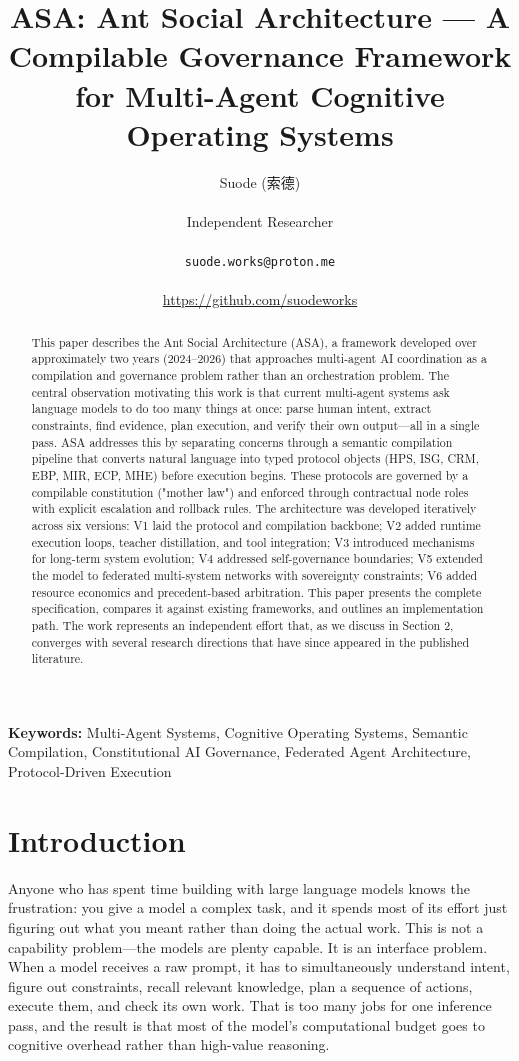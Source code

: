 \documentclass[12pt,a4paper]{article}
\title{ASA: Ant Social Architecture --- A Compilable Governance Framework for Multi-Agent Cognitive Operating Systems}
\author{Suode (索德) \\\\ Independent Researcher \\\\ \texttt{suode.works@proton.me} \\\\ \url{https://github.com/suodeworks}}
\date{}
\begin{document}
\maketitle

\begin{abstract}
This paper describes the Ant Social Architecture (ASA), a framework developed over approximately two years (2024--2026) that approaches multi-agent AI coordination as a compilation and governance problem rather than an orchestration problem. The central observation motivating this work is that current multi-agent systems ask language models to do too many things at once: parse human intent, extract constraints, find evidence, plan execution, and verify their own output---all in a single pass. ASA addresses this by separating concerns through a semantic compilation pipeline that converts natural language into typed protocol objects (HPS, ISG, CRM, EBP, MIR, ECP, MHE) before execution begins. These protocols are governed by a compilable constitution ("mother law") and enforced through contractual node roles with explicit escalation and rollback rules. The architecture was developed iteratively across six versions: V1 laid the protocol and compilation backbone; V2 added runtime execution loops, teacher distillation, and tool integration; V3 introduced mechanisms for long-term system evolution; V4 addressed self-governance boundaries; V5 extended the model to federated multi-system networks with sovereignty constraints; V6 added resource economics and precedent-based arbitration. This paper presents the complete specification, compares it against existing frameworks, and outlines an implementation path. The work represents an independent effort that, as we discuss in Section 2, converges with several research directions that have since appeared in the published literature.
\end{abstract}

\noindent\textbf{Keywords:} Multi-Agent Systems, Cognitive Operating Systems, Semantic Compilation, Constitutional AI Governance, Federated Agent Architecture, Protocol-Driven Execution


\section{Introduction}


Anyone who has spent time building with large language models knows the frustration: you give a model a complex task, and it spends most of its effort just figuring out what you meant rather than doing the actual work. This is not a capability problem---the models are plenty capable. It is an interface problem. When a model receives a raw prompt, it has to simultaneously understand intent, figure out constraints, recall relevant knowledge, plan a sequence of actions, execute them, and check its own work. That is too many jobs for one inference pass, and the result is that most of the model's computational budget goes to cognitive overhead rather than high-value reasoning.
\end{document}
